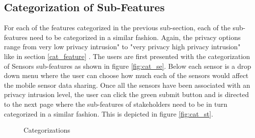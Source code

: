 \subsection{Categorization of Sub-Features}
For each of the features categorized in the previous sub-section, each of the sub-features need to be categorized in a similar fashion. Again,
the privacy options range from very low privacy intrusion" to "very privacy high privacy intrusion" like in section \ref{cat_feature} . The users are first presented with
the categorization of Sensors sub-features as shown in figure \ref{fig:cat_se}. Below each sensor is a drop down menu where the user can choose how much each of the sensors
would affect the mobile sensor data sharing. Once all the sensors have been associated with an privacy intrusion level, the user can click the green submit button and is directed to
the next page where the sub-features of stakeholders need to be in turn categorized in a similar fashion. This is depicted in
figure \ref{fig:cat_st}.
\begin{figure}[htp]
  \caption{Categorizations}
  \label{fig:cat1}
\end{figure}

